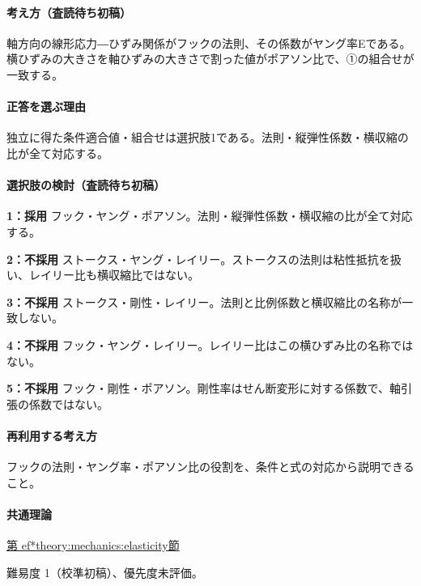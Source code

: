 \paragraph{考え方（査読待ち初稿）} 軸方向の線形応力―ひずみ関係がフックの法則、その係数がヤング率Eである。横ひずみの大きさを軸ひずみの大きさで割った値がポアソン比で、①の組合せが一致する。

\paragraph{正答を選ぶ理由} 独立に得た条件適合値・組合せは選択肢1である。法則・縦弾性係数・横収縮の比が全て対応する。

\paragraph{選択肢の検討（査読待ち初稿）}

\noindent\textbf{1：採用} フック・ヤング・ポアソン。法則・縦弾性係数・横収縮の比が全て対応する。\par

\noindent\textbf{2：不採用} ストークス・ヤング・レイリー。ストークスの法則は粘性抵抗を扱い、レイリー比も横収縮比ではない。\par

\noindent\textbf{3：不採用} ストークス・剛性・レイリー。法則と比例係数と横収縮比の名称が一致しない。\par

\noindent\textbf{4：不採用} フック・ヤング・レイリー。レイリー比はこの横ひずみ比の名称ではない。\par

\noindent\textbf{5：不採用} フック・剛性・ポアソン。剛性率はせん断変形に対する係数で、軸引張の係数ではない。\par

\paragraph{再利用する考え方} フックの法則・ヤング率・ポアソン比の役割を、条件と式の対応から説明できること。

\paragraph{共通理論} \hyperref[theory:mechanics:elasticity]{第
ef*{theory:mechanics:elasticity}節}

\par 難易度 1（校準初稿）、優先度未評価。

